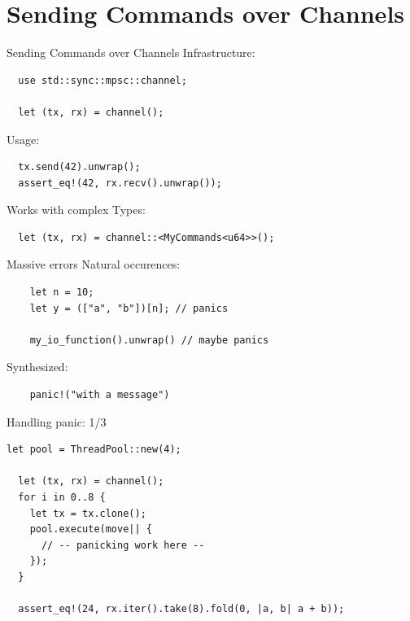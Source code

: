 \documentclass[aspectratio=1610,t]{beamer}
\begin{document}
{
\section{Sending Commands over Channels}
}

\begin{frame}[fragile]{Sending Commands over Channels}
  Infrastructure:
  \begin{verbatim}
  use std::sync::mpsc::channel;

  let (tx, rx) = channel();
  \end{verbatim}

\pause
  Usage:
  \begin{verbatim}
  tx.send(42).unwrap();
  assert_eq!(42, rx.recv().unwrap());
  \end{verbatim}

\pause
  Works with complex Types:
  \begin{verbatim}
  let (tx, rx) = channel::<MyCommands<u64>>();
  \end{verbatim}
\end{frame}



\begin{frame}[fragile]{Massive errors}
  Natural occurences:
  \begin{verbatim}
    let n = 10;
    let y = (["a", "b"])[n]; // panics

    my_io_function().unwrap() // maybe panics
  \end{verbatim}

\pause
  Synthesized:
  \begin{verbatim}
    panic!("with a message")
  \end{verbatim}
\end{frame}


\begin{frame}[fragile]{Handling panic: 1/3}
  \begin{verbatim}
let pool = ThreadPool::new(4);

  let (tx, rx) = channel();
  for i in 0..8 {
    let tx = tx.clone();
    pool.execute(move|| {
      // -- panicking work here --
    });
  }

  assert_eq!(24, rx.iter().take(8).fold(0, |a, b| a + b));
  \end{verbatim}
\end{frame}
\end{document}
